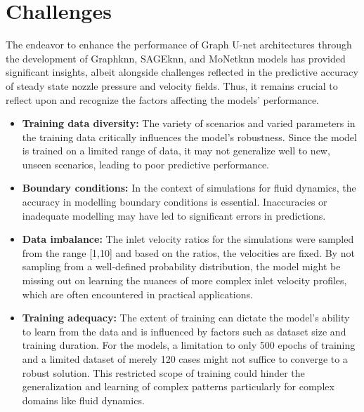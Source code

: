 \section{Challenges}
The endeavor to enhance the performance of Graph U-net architectures through the development of Graphknn, SAGEknn, and MoNetknn models has provided significant insights, albeit alongside challenges reflected in the predictive accuracy of steady state nozzle pressure and velocity fields. Thus, it remains crucial to reflect upon and recognize the factors affecting the models' performance. 
\begin{itemize}
\item \textbf{Training data diversity:} The variety of scenarios and varied parameters in the training data critically influences the model's robustness. Since the model is trained on a limited range of data, it may not generalize well to new, unseen scenarios, leading to poor predictive performance.
\item \textbf{Boundary conditions:} In the context of simulations for fluid dynamics, the accuracy in modelling boundary conditions is essential. Inaccuracies or inadequate modelling may have led to significant errors in predictions.
\item \textbf{Data imbalance:} The inlet velocity ratios for the simulations were sampled from the range [1,10] and based on the ratios, the velocities are fixed. By not sampling from a well-defined probability distribution, the model might be missing out on learning the nuances of more complex inlet velocity profiles, which are often encountered in practical applications.
\item \textbf{Training adequacy:} The extent of training can dictate the model's ability to learn from the data and is influenced by factors such as dataset size and training duration. For the models, a limitation to only 500 epochs of training and a limited dataset of merely 120 cases might not suffice to converge to a robust solution. This restricted scope of training could hinder the generalization and learning of complex patterns particularly for complex domains like fluid dynamics.
\end{itemize}
